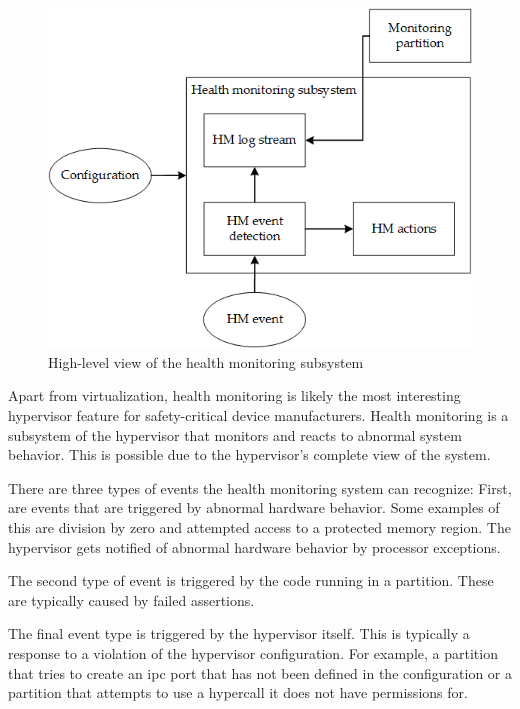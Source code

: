 \begin{figure}[hb!]
\centering
\includegraphics[scale=0.50]{Figures/health_monitoring.png}
\decoRule
\caption{High-level view of the health monitoring subsystem}
\label{fig:health_monitoring}
\end{figure}
Apart from virtualization, health monitoring is likely the most interesting hypervisor feature for safety-critical device manufacturers. Health monitoring is a subsystem of the hypervisor that monitors and reacts to abnormal system behavior. This is possible due to the hypervisor's complete view of the system.

There are three types of events the health monitoring system can recognize: First, are events that are triggered by abnormal hardware behavior. Some examples of this are division by zero and attempted access to a protected memory region. The hypervisor gets notified of abnormal hardware behavior by processor exceptions.

The second type of event is triggered by the code running in a partition. These are typically caused by failed assertions. 

The final event type is triggered by the hypervisor itself. This is typically a response to a violation of the hypervisor configuration. For example, a partition that tries to create an \acrshort{ipc} port that has not been defined in the configuration or a partition that attempts to use a hypercall it does not have permissions for.

